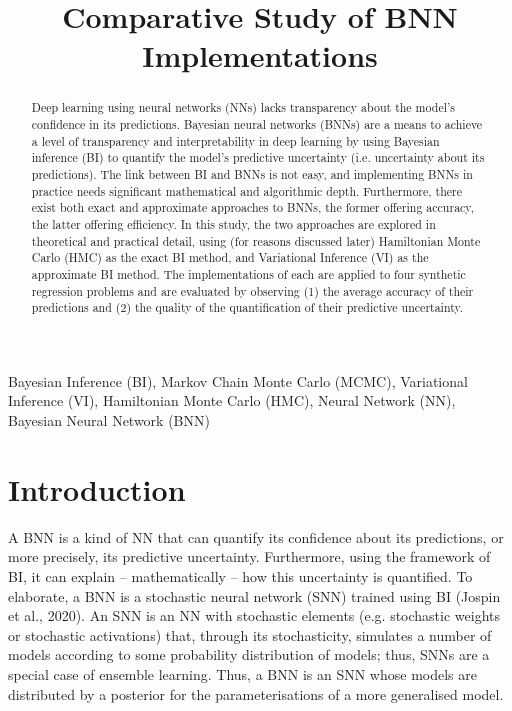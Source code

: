 \documentclass[conference]{IEEEtran}
\begin{document}


\title{Comparative Study of BNN Implementations\\}

\author{}

\maketitle

\begin{abstract}
Deep learning using neural networks (NNs) lacks transparency about the model's confidence in its predictions. Bayesian neural networks (BNNs) are a means to achieve a level of transparency and interpretability in deep learning by using Bayesian inference (BI) to quantify the model's predictive uncertainty (i.e. uncertainty about its predictions). The link between BI and BNNs is not easy, and implementing BNNs in practice needs significant mathematical and algorithmic depth. Furthermore, there exist both exact and approximate approaches to BNNs, the former offering accuracy, the latter offering efficiency. In this study, the two approaches are explored in theoretical and practical detail, using (for reasons discussed later) Hamiltonian Monte Carlo (HMC) as the exact BI method, and Variational Inference (VI) as the approximate BI method. The implementations of each are applied to four synthetic regression problems and are evaluated by observing (1) the average accuracy of their predictions and (2) the quality of the quantification of their predictive uncertainty.\\
\end{abstract}

\begin{IEEEkeywords}
Bayesian Inference (BI), Markov Chain Monte Carlo (MCMC), Variational Inference (VI), Hamiltonian Monte Carlo (HMC), Neural Network (NN), Bayesian Neural Network (BNN)
\end{IEEEkeywords}

\section{Introduction}
A BNN is a kind of NN that can quantify its confidence about its predictions, or more precisely, its predictive uncertainty. Furthermore, using the framework of BI, it can explain – mathematically – how this uncertainty is quantified. To elaborate, a BNN is a stochastic neural network (SNN) trained using BI (Jospin et al., 2020). An SNN is an NN with stochastic elements (e.g. stochastic weights or stochastic activations) that, through its stochasticity, simulates a number of models according to some probability distribution of models; thus, SNNs are a special case of ensemble learning. Thus, a BNN is an SNN whose models are distributed by a posterior for the parameterisations of a more generalised model.\\
\end{document}
